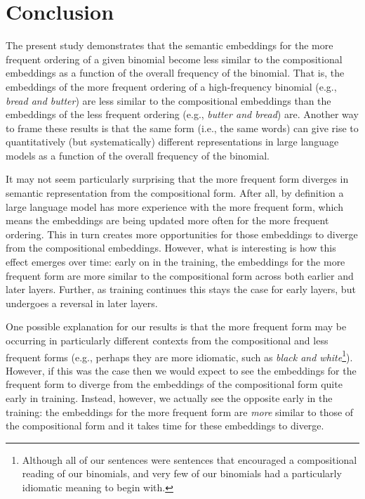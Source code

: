 \documentclass[
  12pt,
  letterpaper,
]{scrreport}
\begin{document}
\section{Conclusion}\label{conclusion-2}

The present study demonstrates that the semantic embeddings for the more
frequent ordering of a given binomial become less similar to the
compositional embeddings as a function of the overall frequency of the
binomial. That is, the embeddings of the more frequent ordering of a
high-frequency binomial (e.g., \emph{bread and butter}) are less similar
to the compositional embeddings than the embeddings of the less frequent
ordering (e.g., \emph{butter and bread}) are. Another way to frame these
results is that the same form (i.e., the same words) can give rise to
quantitatively (but systematically) different representations in large
language models as a function of the overall frequency of the binomial.

It may not seem particularly surprising that the more frequent form
diverges in semantic representation from the compositional form. After
all, by definition a large language model has more experience with the
more frequent form, which means the embeddings are being updated more
often for the more frequent ordering. This in turn creates more
opportunities for those embeddings to diverge from the compositional
embeddings. However, what is interesting is how this effect emerges over
time: early on in the training, the embeddings for the more frequent
form are more similar to the compositional form across both earlier and
later layers. Further, as training continues this stays the case for
early layers, but undergoes a reversal in later layers.

One possible explanation for our results is that the more frequent form
may be occurring in particularly different contexts from the
compositional and less frequent forms (e.g., perhaps they are more
idiomatic, such as \emph{black and white}\footnote{Although all of our
  sentences were sentences that encouraged a compositional reading of
  our binomials, and very few of our binomials had a particularly
  idiomatic meaning to begin with.}). However, if this was the case then
we would expect to see the embeddings for the frequent form to diverge
from the embeddings of the compositional form quite early in training.
Instead, however, we actually see the opposite early in the training:
the embeddings for the more frequent form are \emph{more} similar to
those of the compositional form and it takes time for these embeddings
to diverge.
\end{document}
